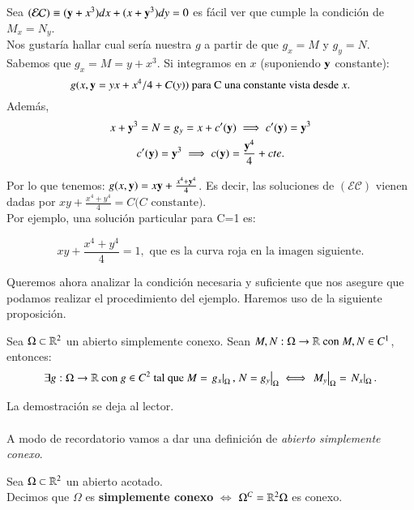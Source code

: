 \begin{eg}
    Sea $\mathcal{(EC)} \equiv (\mathbf{y}+x^3) dx + (x+\mathbf{y}^3) dy = 0$ es fácil ver que cumple la condición de $M_x = N_y$.\\
    Nos gustaría hallar cual sería nuestra $g$ a partir de que $g_x=M$ y $g_y=N$. Sabemos que $g_x = M = y + x^3$.
    Si integramos en $x$ (suponiendo $\mathbf{y}$ constante):
    $$
    g(x,\mathbf{y} = yx + x^4/4 + C(y)) \text{ para C una constante vista desde $x$}.
    $$
    Además,
    \begin{gather*}
        x+\mathbf{y}^3 = N = g_y = x + c'(\mathbf{y}) \implies c'(\mathbf{y}) = \mathbf{y}^3\\
        c'(\mathbf{y}) = \mathbf{y}^3 \implies c(\mathbf{y}) = \frac{\mathbf{y}^4}{4} + cte.
    \end{gather*}

    Por lo que tenemos: $g(x,\mathbf{y}) = x\mathbf{y} + \frac{x^4+\mathbf{y}^4}{4}$. Es decir, las soluciones de $\mathcal{(EC)}$ vienen dadas por $xy + \frac{x^4+y^4}{4} = C \text{($C$ constante)}$.\\

    Por ejemplo, una solución particular para C=1 es:

    $$xy + \frac{x^4+y^4}{4} = 1, \text{ que es la curva roja en la imagen siguiente.}$$
    \begin{center}
    \end{center}
\end{eg}

Queremos ahora analizar la condición necesaria y suficiente que nos asegure que podamos realizar el procedimiento del ejemplo. Haremos uso de la siguiente proposición.
\begin{pro}
Sea $\Omega\subset\mathbb{R}^2$ un abierto simplemente conexo. Sean $M, N : \Omega \to \mathbb{R}\text{ con } M,N \in C^1$, entonces:
$$
\exists g : \Omega \to \mathbb{R} \text{ con } g \in C^2 \text{ tal que } M = \left.g_x\right|_\Omega, \left.N=g_y\right|_\Omega \iff \left.M_y\right|_\Omega = \left.N_x\right|_\Omega.
    $$
\end{pro}
La demostración se deja al lector.\\\\
A modo de recordatorio vamos a dar una definición de \textit{abierto simplemente conexo}.
\begin{dfn}
    Sea $\Omega \subset \mathbb{R}^2$ un abierto acotado.\\
    Decimos que $\Omega$ es \textbf{simplemente conexo} $\iff$ $\Omega^C = \mathbb{R}^2\Omega$ es conexo.
\end{dfn}

